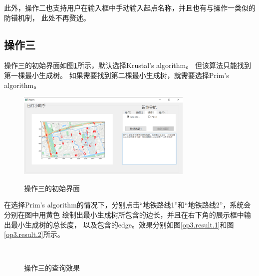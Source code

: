 \documentclass{article}
\begin{document}
此外，操作二也支持用户在输入框中手动输入起点名称，并且也有与操作一类似的防错机制，
此处不再赘述。

\subsection{操作三}
操作三的初始界面如图\ref{op3.init}所示，默认选择Krustal's algorithm。 但该算法只能找到第一棵最小生成树。
如果需要找到第二棵最小生成树，就需要选择Prim's algorithm。
\begin{figure}[H]
	\centering
	{\includegraphics[width=0.75\textwidth]{image//操作三初始界面.png}} 
	\caption{操作三的初始界面} \label{op3.init}
\end{figure}

在选择Prim's algorithm的情况下，分别点击“地铁路线1”和“地铁路线2”，系统会分别在图中用黄色
绘制出最小生成树所包含的边长，并且在右下角的展示框中输出最小生成树的总长度，
以及包含的edge。效果分别如图\ref{op3.result.1}和图\ref{op3.result.2}所示。
\begin{figure}[H]
    \centering
    \,    
    \caption{操作三的查询效果} \label{op3.result}
\end{figure}
\end{document}
